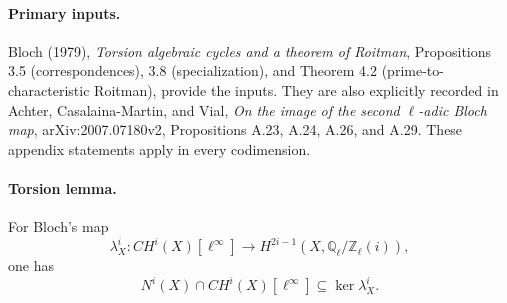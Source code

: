\documentclass[11pt,a4paper]{article}
\theoremstyle{definition}\newtheorem{definition}[theorem]{Definition}
\theoremstyle{remark}\newtheorem{remark}[theorem]{Remark}
\begin{document}
\paragraph{Primary inputs.}
Bloch (1979), \emph{Torsion algebraic cycles and a theorem of Roitman},
Propositions 3.5 (correspondences), 3.8 (specialization), and
Theorem 4.2 (prime-to-characteristic Roitman), provide the inputs.
They are also explicitly recorded in Achter, Casalaina-Martin,
and Vial, \emph{On the image of the second $\ell$-adic Bloch map},
arXiv:2007.07180v2, Propositions A.23, A.24, A.26, and A.29.
These appendix statements apply in every codimension.

\paragraph{Torsion lemma.}
For Bloch's map
\[
 \lambda_X^i:CH^i(X)[\ell^\infty]\longrightarrow
                    H^{2i-1}(X,\mathbb Q_\ell/\mathbb Z_\ell(i)),
\]
one has
\[
 N^i(X)\cap CH^i(X)[\ell^\infty]\subseteq\ker\lambda_X^i.          \tag{AQ.5}
\]
\end{document}
